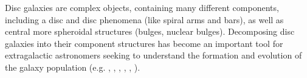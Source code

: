 \documentclass[../main.tex]{subfiles}
\begin{document}
\label{sec:introduction}

Disc galaxies are complex objects, containing many different components, including a disc and disc phenomena (like spiral arms and bars), as well as central more spheroidal structures (bulges, nuclear bulges). Decomposing disc galaxies into their component structures has become an important tool for extragalactic astronomers seeking to understand the formation and evolution of the galaxy population (e.g. \citealt{Simard2002:astro-ph/0205025v2}, \citealt{Simard2011:1107.1518v1} \citealt{2012MNRAS.421.2277L}, \citealt{2017MNRAS.469.3363K}, \citealt{megamorph-paper}, \citealt{Gadotti2010:1003.1719v2} \citealt{Mendez-Abreu2016:1610.05324v1}, \citealt{Park2006:astro-ph/0611610v2}).






\end{document}
